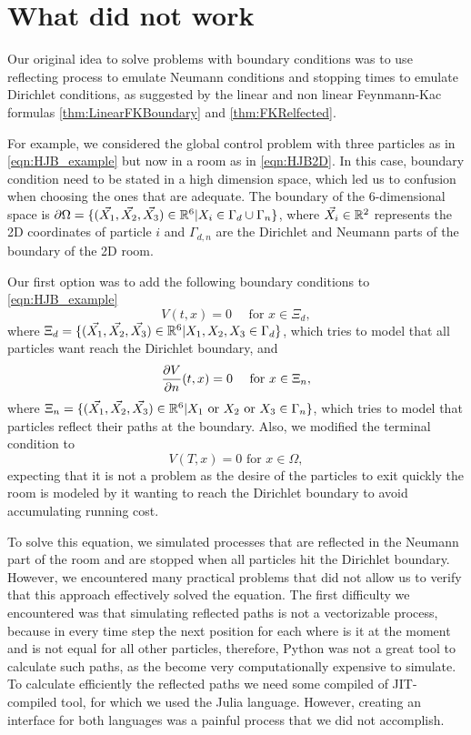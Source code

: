 \section*{What did not work}
Our original idea to solve problems with boundary conditions was to use reflecting process to emulate Neumann conditions and stopping times to emulate Dirichlet conditions, as suggested by the linear and non linear Feynmann-Kac formulas \autoref{thm:LinearFKBoundary} and \autoref{thm:FKRelfected}. 

For example, we considered the global control problem with three particles as in \eqref{eqn:HJB_example} but now in a room as in \eqref{eqn:HJB2D}. In this case, boundary condition need to be stated in a high dimension space, which led us to confusion when choosing the ones that are adequate. The boundary of the 6-dimensional space is $\partial \Omega=\{(\vec{X_1},\vec{X_2},\vec{X_3})\in \mathbb{R}^6 |X_i\in \Gamma_d\cup \Gamma _n\}$, where $\vec{X_i}\in \mathbb{R}^2$ represents the 2D coordinates of particle $i$ and $\Gamma_{d,n}$ are the Dirichlet and Neumann parts of the boundary of the 2D room. 

Our first option was to add the following boundary conditions to \eqref{eqn:HJB_example}
\begin{equation}
	V(t,x)=0 \quad \text{ for } x\in \Xi_d,
\end{equation}
where $\Xi_d=\{(\vec{X_1},\vec{X_2},\vec{X_3})\in \mathbb{R}^6 | X_1,X_2,X_3\in \Gamma_d \}$, which tries to model that all particles want reach the Dirichlet boundary, and
\begin{equation}
	\frac{\partial V}{\partial n}(t,x)=0 \quad \text{ for } x\in \Xi_n,
\end{equation}
where $\Xi_n=\{(\vec{X_1},\vec{X_2},\vec{X_3})\in \mathbb{R}^6 | X_1 \text{ or } X_2 \text{ or } X_3\in \Gamma_n \}$, which tries to model that particles reflect their paths at the boundary. Also, we modified the terminal condition to 
\begin{equation}
	V(T,x)=0 \text{ for } x\in \Omega,
\end{equation}
expecting that it is not a problem as the desire of the particles to exit quickly the room is modeled by it wanting to reach the Dirichlet boundary to avoid accumulating running cost. 


To solve this equation, we simulated processes that are reflected in the Neumann part of the room and are stopped when all particles hit the Dirichlet boundary. However, we encountered many practical problems that did not allow us to verify that this approach effectively solved the equation. The first difficulty we encountered was that simulating reflected paths is not a vectorizable process, because in every time step the next position for each where is it at the moment and is not equal for all other particles, therefore, Python was not a great tool to calculate such paths, as the become very computationally expensive to simulate. To calculate efficiently the reflected paths we need some compiled of JIT-compiled tool, for which we used the Julia language. However, creating an interface for both languages was a painful process that we did not accomplish.

